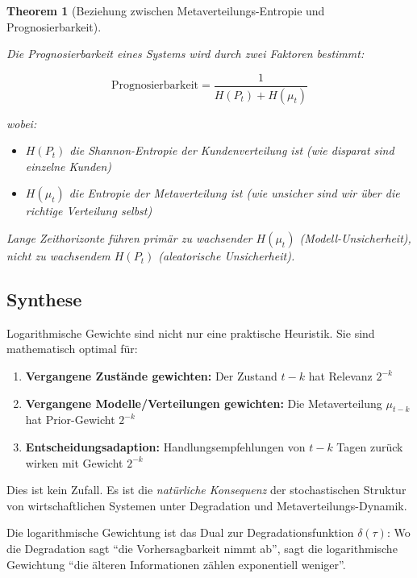 \documentclass[a4paper, 12pt, twoside, openright]{report}
\newtheorem{theorem}{Theorem}[section]
\theoremstyle{definition}
\theoremstyle{definition}
\begin{document}
\begin{theorem}[Beziehung zwischen Metaverteilungs-Entropie und Prognosierbarkeit]
\label{thm:meta_entropy_predictability}

Die Prognosierbarkeit eines Systems wird durch zwei Faktoren bestimmt:

\begin{equation}
\text{Prognosierbarkeit} = \frac{1}{H(P_t) + H(\mu_t)}
\label{eq:total_predictability}
\end{equation}

wobei:
\begin{itemize}
  \item $H(P_t)$ die Shannon-Entropie der Kundenverteilung ist (wie disparat sind einzelne Kunden)
  \item $H(\mu_t)$ die Entropie der Metaverteilung ist (wie unsicher sind wir über die richtige Verteilung selbst)
\end{itemize}

Lange Zeithorizonte führen primär zu wachsender $H(\mu_t)$ (Modell-Unsicherheit), nicht zu wachsendem $H(P_t)$ (aleatorische Unsicherheit).
\end{theorem}

\subsection{Synthese}

Logarithmische Gewichte sind nicht nur eine praktische Heuristik. Sie sind mathematisch optimal für:

\begin{enumerate}
  \item \textbf{Vergangene Zustände gewichten:} Der Zustand $t-k$ hat Relevanz $2^{-k}$
  
  \item \textbf{Vergangene Modelle/Verteilungen gewichten:} Die Metaverteilung $\mu_{t-k}$ hat Prior-Gewicht $2^{-k}$
  
  \item \textbf{Entscheidungsadaption:} Handlungsempfehlungen von $t-k$ Tagen zurück wirken mit Gewicht $2^{-k}$
\end{enumerate}

Dies ist kein Zufall. Es ist die \emph{natürliche Konsequenz} der stochastischen Struktur von wirtschaftlichen Systemen unter Degradation und Metaverteilungs-Dynamik.

Die logarithmische Gewichtung ist das Dual zur Degradationsfunktion $\delta(\tau)$: Wo die Degradation sagt ``die Vorhersagbarkeit nimmt ab'', sagt die logarithmische Gewichtung ``die älteren Informationen zählen exponentiell weniger''.
\end{document}
